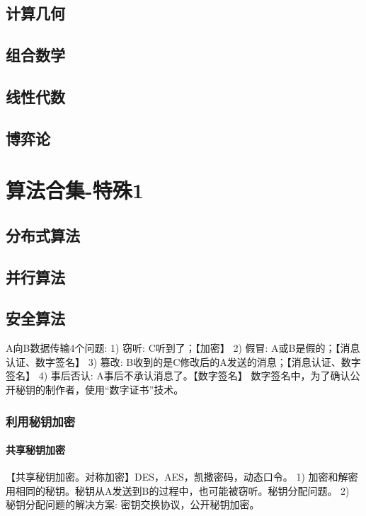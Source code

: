 \documentclass[UTF8]{../computerUniverse}
\begin{document}
\section{计算几何}

\section{组合数学}
\section{线性代数}
\section{博弈论}



\chapter{算法合集-特殊1}


\section{分布式算法}
\section{并行算法}

\section{安全算法}

A向B数据传输4个问题: 
1) 窃听: C听到了；【加密】
2) 假冒: A或B是假的；【消息认证、数字签名】
3) 篡改: B收到的是C修改后的A发送的消息；【消息认证、数字签名】
4) 事后否认: A事后不承认消息了。【数字签名】
数字签名中，为了确认公开秘钥的制作者，使用“数字证书”技术。



\subsection{利用秘钥加密}

\subsubsection{共享秘钥加密}
【共享秘钥加密。对称加密】DES，AES，凯撒密码，动态口令。
1) 加密和解密用相同的秘钥。秘钥从A发送到B的过程中，也可能被窃听。秘钥分配问题。
2) 秘钥分配问题的解决方案: 密钥交换协议，公开秘钥加密。
\end{document}
